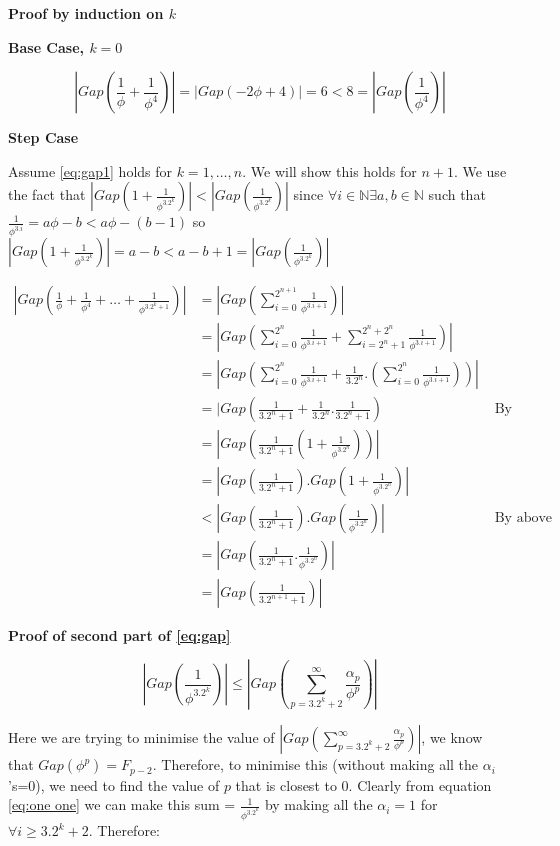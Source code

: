 \documentclass{cs4rep}
\begin{document}
{\bf Proof by induction on $k$}

{\bf Base Case, $k=0$}

\[ |Gap(\frac{1}{\phi}+\frac{1}{\phi^{4}})| = |Gap(-2\phi+4)| = 6 < 8 = |Gap(\frac{1}{\phi^{4}})| \]

{\bf Step Case}

Assume \ref{eq:gap1} holds for $k = 1,\ldots,n$. We will show this
holds for $n+1$. We use the fact that $
|Gap(1+\frac{1}{\phi^{3.2^{k}}})| < |Gap(\frac{1}{\phi^{3.2^{k}}})|$
since $\forall i \in \mathbb{N} \exists a,b \in \mathbb{N}$ such that
$\frac{1}{\phi^{3.i}} = a\phi-b < a\phi - (b-1)$ so
$|Gap(1+\frac{1}{\phi^{3.2^{k}}})| = a-b < a-b+1 =
|Gap(\frac{1}{\phi^{3.2^{k}}})|$

\[ \begin{array}{rll}
|Gap(\frac{1}{\phi}+\frac{1}{\phi^{4}} + \ldots + \frac{1}{\phi^{3.2^{k}+1}})| & = |Gap(\sum_{i=0}^{2^{n+1}} \frac{1}{\phi^{3.i+1}})| \\
& = |Gap(\sum_{i=0}^{2^{n}} \frac{1}{\phi^{3.i+1}} + \sum_{i=2^{n}+1}^{2^{n}+2^{n}} \frac{1}{\phi^{3.i+1}})| \\
& = |Gap(\sum_{i=0}^{2^{n}} \frac{1}{\phi^{3.i+1}} + \frac{1}{3.2^{n}}.(\sum_{i=0}^{2^{n}} \frac{1}{\phi^{3.i+1}}))| \\
& = |Gap(\frac{1}{3.2^{n}+1} + \frac{1}{3.2^{n}}.\frac{1}{3.2^{n}+1}) & \mbox{ By inductive hypothesis} \\
& = |Gap(\frac{1}{3.2^{n}+1}(1+\frac{1}{\phi^{3.2^{n}}}))| \\
& = |Gap(\frac{1}{3.2^{n}+1}).Gap(1+\frac{1}{\phi^{3.2^{n}}})| \\
& < |Gap(\frac{1}{3.2^{n}+1}).Gap(\frac{1}{\phi^{3.2^{n}}})| & \mbox{ By above} \\
& = |Gap(\frac{1}{3.2^{n}+1}.\frac{1}{\phi^{3.2^{n}}})| \\
& = |Gap(\frac{1}{3.2^{n+1}+1})|
\end{array} \]

{\bf Proof of second part of \ref{eq:gap}}

\begin{equation}
| Gap(\frac{1}{\phi^{3.2^{k}}}) | \leq | Gap(\sum_{p=3.2^{k}+2}^{\infty} \frac{\alpha_{p}}{\phi^{p}}) | \label{eq:gap2}
\end{equation}

Here we are trying to minimise the value of $
|Gap(\sum_{p=3.2^{k}+2}^{\infty} \frac{\alpha_{p}}{\phi^{p}})|$, we
know that $Gap(\phi^{p}) = F_{p-2}$. Therefore, to minimise this
(without making all the $\alpha_{i}$'s=0), we need to find the value
of $p$ that is closest to 0. Clearly from equation \ref{eq:one one} we
can make this sum = $\frac{1}{\phi^{3.2^{k}}}$ by making all the
$\alpha_{i} = 1$ for $\forall i \geq 3.2^{k}+2$. Therefore:
\end{document}
